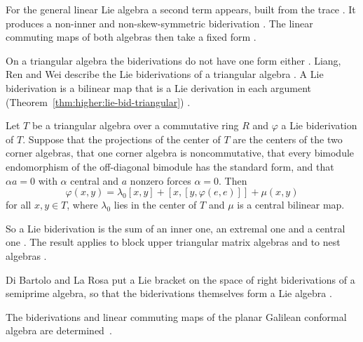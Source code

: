 For the general linear Lie algebra a second term appears, built from the trace
\cite[Theorem~3.2, p.~8]{Tang2017Biderivations}. It produces a non-inner and
non-skew-symmetric biderivation \cite[p.~1]{Tang2017Biderivations}. The linear
commuting maps of both algebras then take a fixed form \cite[Theorems~3.4
and~3.5, p.~9]{Tang2017Biderivations}.

On a triangular algebra the biderivations do not have one form either
\cite[p.~1]{LiangRenWei2020}. Liang, Ren and Wei describe the Lie
biderivations of a triangular algebra \cite[p.~1]{LiangRenWei2020}. A Lie
biderivation is a bilinear map that is a Lie derivation in each argument
(Theorem~\ref{thm:higher:lie-bid-triangular}) \cite[p.~1]{LiangRenWei2020}.

\begin{theorem}\label{thm:higher:lie-bid-triangular}
Let $T$ be a triangular algebra over a commutative ring $R$ and $\varphi$ a Lie
biderivation of $T$. Suppose that the projections of the center of $T$ are the
centers of the two corner algebras, that one corner algebra is noncommutative,
that every bimodule endomorphism of the off-diagonal bimodule has the standard
form, and that $\alpha a=0$ with $\alpha$ central and $a$ nonzero forces
$\alpha=0$. Then
\[
\varphi(x,y)=\lambda_{0}[x,y]+[x,[y,\varphi(e,e)]]+\mu(x,y)
\]
for all $x,y\in T$, where $\lambda_{0}$ lies in the center of $T$ and $\mu$ is a
central bilinear map.
\end{theorem}

So a Lie biderivation is the sum of an inner one, an extremal one and a
central one \cite[p.~1]{LiangRenWei2020}. The result applies to block upper
triangular matrix algebras and to nest algebras \cite[Corollaries~3.8 and~3.9,
p.~14]{LiangRenWei2020}.

Di Bartolo and La Rosa put a Lie bracket on the space of right biderivations
of a semiprime algebra, so that the biderivations themselves form a Lie
algebra \cite[Abstract, p.~1]{DiBartoloLaRosa2026}.

The biderivations and linear commuting maps of the planar Galilean conformal
algebra are determined~\cite{WlBiderivationsAndLinearCommutin2020}.
